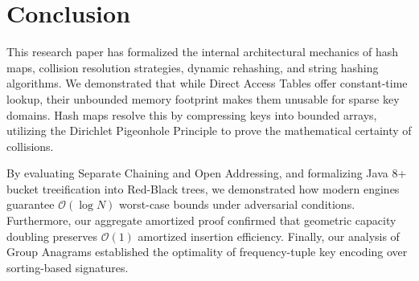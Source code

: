 \documentclass[10pt,twocolumn,letterpaper]{article}
\begin{document}
\section{Conclusion}
\label{sec:conclusion}

This research paper has formalized the internal architectural mechanics of hash maps, collision resolution strategies, dynamic rehashing, and string hashing algorithms. We demonstrated that while Direct Access Tables offer constant-time lookup, their unbounded memory footprint makes them unusable for sparse key domains. Hash maps resolve this by compressing keys into bounded arrays, utilizing the Dirichlet Pigeonhole Principle to prove the mathematical certainty of collisions.

By evaluating Separate Chaining and Open Addressing, and formalizing Java 8+ bucket treeification into Red-Black trees, we demonstrated how modern engines guarantee $\mathcal{O}(\log N)$ worst-case bounds under adversarial conditions. Furthermore, our aggregate amortized proof confirmed that geometric capacity doubling preserves $\mathcal{O}(1)$ amortized insertion efficiency. Finally, our analysis of Group Anagrams established the optimality of frequency-tuple key encoding over sorting-based signatures.

\end{document}
